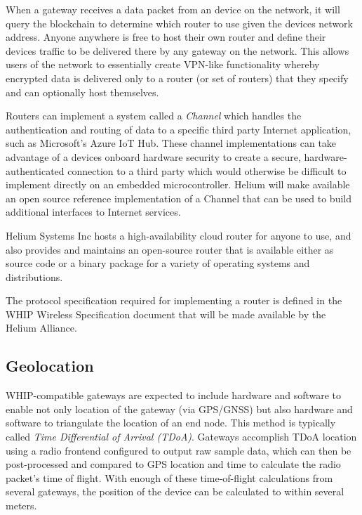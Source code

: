 \documentclass[letterpaper,11pt]{article}
\begin{document}
When a gateway receives a data packet from an device on the network, it will query the blockchain to determine which router to use given the devices network address. Anyone anywhere is free to host their own router and define their devices traffic to be delivered there by any gateway on the network. This allows users of the network to essentially create VPN-like functionality whereby encrypted data is delivered only to a router (or set of routers) that they specify and can optionally host themselves.

Routers can implement a system called a \emph{Channel} which handles the authentication and routing of data to a specific third party Internet application, such as Microsoft's Azure IoT Hub\cite{azure}. These channel implementations can take advantage of a devices onboard hardware security to create a secure, hardware-authenticated connection to a third party which would otherwise be difficult to implement directly on an embedded microcontroller. Helium will make available an open source reference implementation of a Channel that can be used to build additional interfaces to Internet services.

Helium Systems Inc hosts a high-availability cloud router for anyone to use, and also provides and maintains an open-source router that is available either as source code or a binary package for a variety of operating systems and distributions.

The protocol specification required for implementing a router is defined in the WHIP Wireless Specification document that will be made available by the Helium Alliance\cite{alliance}.

\subsection{Geolocation}\label{geolocation}

WHIP-compatible gateways are expected to include hardware and software to enable not only location of the gateway (via GPS/GNSS) but also hardware and software to triangulate the location of an end node. This method is typically called \emph{Time Differential of Arrival (TDoA)}. Gateways accomplish TDoA location using a radio frontend configured to output raw sample data, which can then be post-processed and compared to GPS location and time to calculate the radio packet's time of flight. With enough of these time-of-flight calculations from several gateways, the position of the device can be calculated to within several meters.
\end{document}
